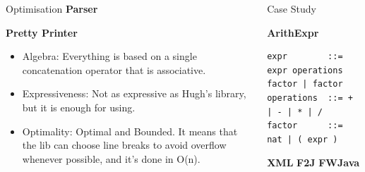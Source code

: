 \documentclass[final]{beamer}
\newlength{\onecolwid}
\newlength{\twocolwid}
\begin{document}
\begin{frame}[t]
\begin{columns}[t]
\begin{column}{\twocolwid}
\begin{columns}[t,totalwidth=\twocolwid]
\begin{column}{\onecolwid}
\begin{block}{Optimisation}
\textbf{Parser}

\textbf{Pretty Printer}
\begin{itemize}
\item Algebra: Everything is based on a single concatenation operator that is associative.
\item Expressiveness: Not as expressive as Hugh's library, but it is enough for using.
\item Optimality: Optimal and Bounded. It means that the lib can choose line breaks to avoid overflow whenever possible, and it's done in O(n).
\end{itemize}


\end{block}


\end{column} %

\begin{column}{\onecolwid} %


\begin{block}{Case Study}

\textbf{ArithExpr}

\begin{lstlisting}
expr        ::= expr operations factor | factor
operations  ::= + | - | * | /
factor      ::= nat | ( expr )
\end{lstlisting}

\textbf{XML}
\textbf{F2J}
\textbf{FWJava}




\end{block}
\end{column}
\end{columns}
\end{column}
\end{columns}
\end{frame}
\end{document}
